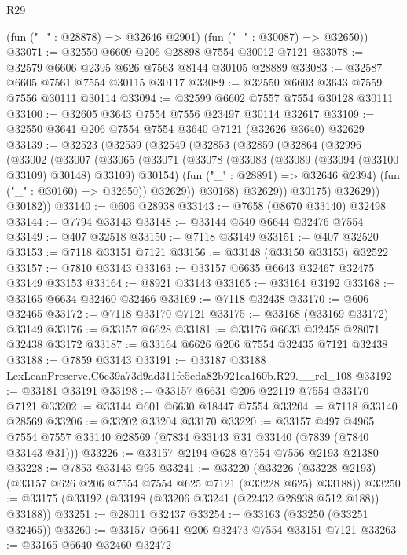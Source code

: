 \begin{lexlean}{R29}
\begin{coremodule}
      (fun ("_" : @28878) => @32646 @2901)
      (fun ("_" : @30087) => @32650))
@33071 := @32550 @6609 @206 @28898 @7554 @30012 @7121
@33078 := @32579 @6606 @2395 @626 @7563 @8144 @30105 @28889
@33083 := @32587 @6605 @7561 @7554 @30115 @30117
@33089 := @32550 @6603 @3643 @7559 @7556 @30111 @30114
@33094 := @32599 @6602 @7557 @7554 @30128 @30111
@33100 := @32605 @3643 @7554 @7556 @23497 @30114 @32617
@33109 := @32550 @3641 @206 @7554 @7554 @3640 @7121 (@32626 @3640) @32629
@33139 := @32523
    (@32539
      (@32549
        (@32853
          (@32859
            (@32864
              (@32996
                (@33002
                  (@33007
                    (@33065
                      (@33071
                        (@33078
                          (@33083 (@33089 (@33094 (@33100 @33109) @30148) @33109) @30154)
                          (fun ("_" : @28891) => @32646 @2394)
                          (fun ("_" : @30160) => @32650))
                        @32629))
                    @30168)
                  @32629))
              @30175)
            @32629))
        @30182))
@33140 := @606 @28938
@33143 := @7658 (@8670 @33140) @32498
@33144 := @7794 @33143
@33148 := @33144 @540 @6644 @32476 @7554
@33149 := @407 @32518
@33150 := @7118 @33149
@33151 := @407 @32520
@33153 := @7118 @33151 @7121
@33156 := @33148 (@33150 @33153) @32522
@33157 := @7810 @33143
@33163 := @33157 @6635 @6643 @32467 @32475 @33149 @33153
@33164 := @8921 @33143
@33165 := @33164 @3192
@33168 := @33165 @6634 @32460 @32466
@33169 := @7118 @32438
@33170 := @606 @32465
@33172 := @7118 @33170 @7121
@33175 := @33168 (@33169 @33172) @33149
@33176 := @33157 @6628
@33181 := @33176 @6633 @32458 @28071 @32438 @33172
@33187 := @33164 @6626 @206 @7554 @32435 @7121 @32438
@33188 := @7859 @33143
@33191 := @33187 @33188 LexLeanPreserve.C6e39a73d9ad311fe5eda82b921ca160b.R29.__rel_108
@33192 := @33181 @33191
@33198 := @33157 @6631 @206 @22119 @7554 @33170 @7121
@33202 := @33144 @601 @6630 @18447 @7554
@33204 := @7118 @33140 @28569
@33206 := @33202 @33204 @33170
@33220 := @33157
    @497
    @4965
    @7554
    @7557
    @33140
    @28569
    (@7834 @33143 @31 @33140 (@7839 (@7840 @33143 @31)))
@33226 := @33157 @2194 @628 @7554 @7556 @2193 @21380
@33228 := @7853 @33143 @95
@33241 := @33220
    (@33226 (@33228 @2193) (@33157 @626 @206 @7554 @7554 @625 @7121 (@33228 @625) @33188))
@33250 := @33175 (@33192 (@33198 (@33206 @33241 (@22432 @28938 @512 @188)) @33188))
@33251 := @28011 @32437
@33254 := @33163 (@33250 (@33251 @32465))
@33260 := @33157 @6641 @206 @32473 @7554 @33151 @7121
@33263 := @33165 @6640 @32460 @32472

\end{coremodule}
\end{lexlean}
